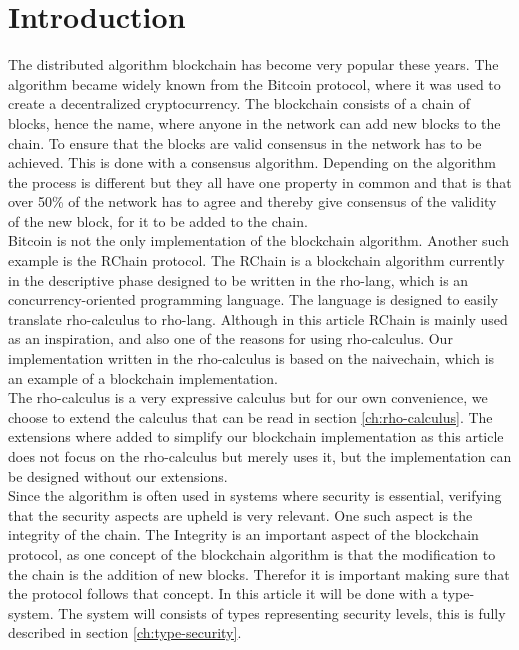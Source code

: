 \section{Introduction}
The distributed algorithm blockchain has become very popular these years. The algorithm became widely known from the Bitcoin protocol, where it was used to create a decentralized cryptocurrency\citep{website:blockchain}. The blockchain consists of a chain of blocks, hence the name, where anyone in the network can add new blocks to the chain. To ensure that the blocks are valid consensus in the network has to be achieved. This is done with a consensus algorithm. Depending on the algorithm the process is different but they all have one property in common and that is that over 50\% of the network has to agree and thereby give consensus of the validity of the new block, for it to be added to the chain.\\
Bitcoin is not the only implementation of the blockchain algorithm. Another such example is the RChain protocol. The RChain is a blockchain algorithm currently in the descriptive phase designed to be written in the rho-lang, which is an concurrency-oriented programming language. The language is designed to easily translate rho-calculus to rho-lang\citep{website:rho-lang}. Although in this article RChain is mainly used as an inspiration, and also one of the reasons for using rho-calculus. Our implementation written in the rho-calculus is based on the naivechain, which is an example of a blockchain implementation\citep{naivechain}.\\

The rho-calculus is a very expressive calculus but for our own convenience, we choose to extend the calculus that can be read in section \ref{ch:rho-calculus}. The extensions where added to simplify our blockchain implementation as this article does not focus on the rho-calculus but merely uses it, but the implementation can be designed without our extensions.\\

Since the algorithm is often used in systems where security is essential, verifying that the security aspects are upheld is very relevant. One such aspect is the integrity of the chain.
The Integrity is an important aspect of the blockchain protocol, as one concept of the blockchain algorithm is that the modification to the chain is the addition of new blocks. Therefor it is important making sure that the protocol follows that concept. In this article it will be done with a type-system. The system will consists of types representing security levels, this is fully described in section \ref{ch:type-security}.
